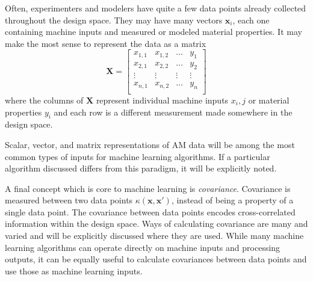 Often, experimenters and modelers have quite a few data points already collected throughout the design space. They may have many vectors $\mathbf{x}_i$, each one containing machine inputs and measured or modeled material properties. It may make the most sense to represent the data as a matrix 
\begin{equation}
	\mathbf{X} = \begin{bmatrix} x_{1,1} & x_{1,2} & \hdots & y_1 \\
						x_{2,1} & x_{2,2} & \hdots & y_2 \\
						\vdots & \vdots & \vdots & \vdots \\
						x_{n,1} & x_{n,2} & \hdots & y_n \\
				\end{bmatrix}
	\label{matrix}
\end{equation}
where the columns of $\mathbf{X}$ represent individual machine inputs $x_i,j$ or material properties $y_i$ and each row is a different measurement made somewhere in the design space. 

Scalar, vector, and matrix representations of AM data will be among the most common types of inputs for machine learning algorithms. If a particular algorithm discussed differs from this paradigm, it will be explicitly noted. 

A final concept which is core to machine learning is \textit{covariance}. Covariance is measured between two data points $\kappa (\mathbf{x},\mathbf{x}')$, instead of being a property of a single data point. The covariance between data points encodes cross-correlated information within the design space. Ways of calculating covariance are many and varied and will be explicitly discussed where they are used. While many machine learning algorithms can operate directly on machine inputs and processing outputs, it can be equally useful to calculate covariances between data points and use those as machine learning inputs.